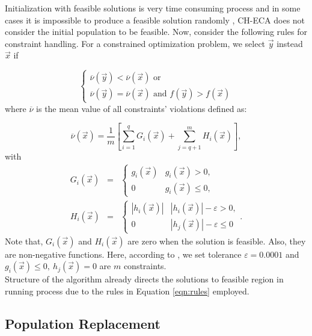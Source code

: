 \documentclass[conference]{IEEEtran}
\begin{document}
Initialization with feasible solutions is very time consuming process and in some cases it is impossible to produce a feasible solution randomly \cite{castillofoundations}, CH-ECA does not consider the initial population to be feasible. Now, consider the following rules for constraint handling. For a constrained optimization problem, we select $\vec{y}$ instead $\vec{x}$ if

\begin{equation}
	\begin{cases}
	\overline{\nu}( \vec{y} ) < \overline{\nu}( \vec{x} )  \text{ or}\\
	\overline{\nu}( \vec{y} ) = \overline{\nu}( \vec{x} ) \text{ and } f(\vec{y}) > f(\vec{x})
	\end{cases}
	\label{eqn:rules}
\end{equation}
where $\overline{\nu}$ is the mean value of all constraints’ violations defined as:

\begin{equation}
	\overline{\nu}( \vec{x} ) = \dfrac{1}{m} \left[ \sum_{i=1}^q G_i(\vec{x}) + \sum_{j=q+1}^m H_i(\vec{x}) \right],
	\label{eqn:nu}
\end{equation}
%
with 
\begin{eqnarray}
	G_i(\vec{x}) &=&
	\begin{cases}
		g_i(\vec{x})   & g_i(\vec{x}) > 0,  \\
		    0          & g_i(\vec{x}) \leq 0,
	\end{cases}
	\\
	H_i(\vec{x}) &=&
	\begin{cases}
		|h_i(\vec{x})|   & |h_i(\vec{x})| - \varepsilon  > 0,  \\
		    0            & |h_j(\vec{x})| - \varepsilon \leq 0
	\end{cases}
	.
\end{eqnarray}
%
Note that, $G_i(\vec{x})$ and $H_i(\vec{x})$ are zero when the solution is feasible. Also, they are non-negative functions. Here, according to \cite{cecCop17}, we set tolerance $\varepsilon = 0.0001$ and $g_i(\vec{x}) \leq 0,\ h_j(\vec{x}) = 0$ are $m$ constraints.\\

Structure of the algorithm already directs the solutions to feasible region in running process due to the rules in Equation  \ref{eqn:rules} employed.


\subsection{Population Replacement} %
\end{document}
